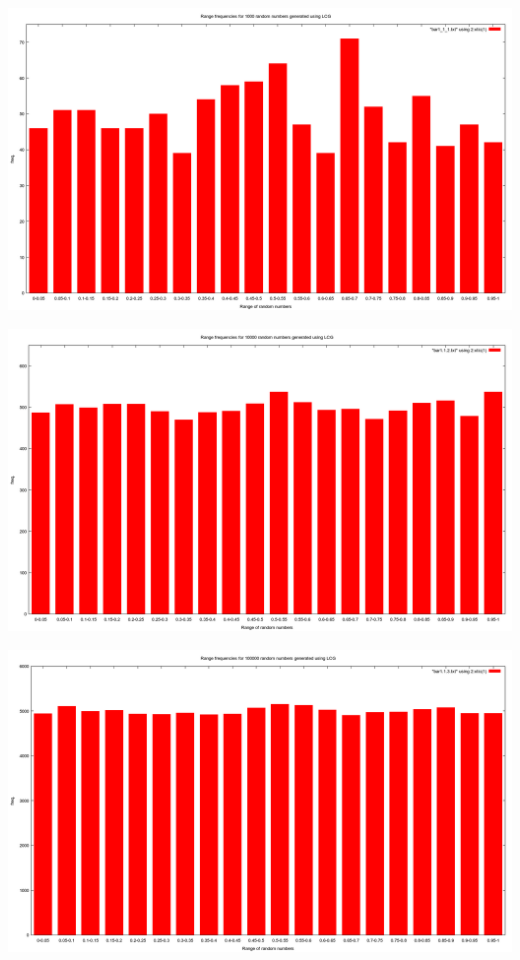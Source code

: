 \documentclass{article}
\begin{document}
\includegraphics[scale=0.3]{"bar1_1_1"}

\includegraphics[scale=0.3]{"bar1_1_2"}

\includegraphics[scale=0.3]{"bar1_1_3"}
\pagebreak
\end{document}

